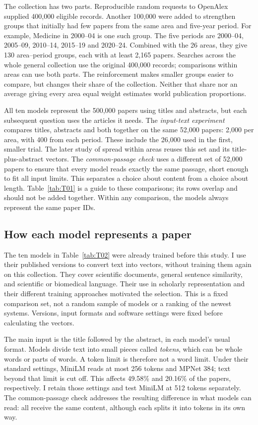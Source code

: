 \documentclass[12pt]{article}
\begin{document}
The collection has two parts. Reproducible random requests to OpenAlex supplied 400,000 eligible records. Another 100,000 were added to strengthen groups that initially had few papers from the same area and five-year period. For example, Medicine in 2000--04 is one such group. The five periods are 2000--04, 2005--09, 2010--14, 2015--19 and 2020--24. Combined with the 26 areas, they give 130 area--period groups, each with at least 2,165 papers. Searches across the whole general collection use the original 400,000 records; comparisons within areas can use both parts. The reinforcement makes smaller groups easier to compare, but changes their share of the collection. Neither that share nor an average giving every area equal weight estimates world publication proportions.

All ten models represent the 500,000 papers using titles and abstracts, but each subsequent question uses the articles it needs. The \emph{input-text experiment} compares titles, abstracts and both together on the same 52,000 papers: 2,000 per area, with 400 from each period. These include the 26,000 used in the first, smaller trial. The later study of spread within areas reuses this set and its title-plus-abstract vectors. The \emph{common-passage check} uses a different set of 52,000 papers to ensure that every model reads exactly the same passage, short enough to fit all input limits. This separates a choice about content from a choice about length. Table~\ref{tab:T01} is a guide to these comparisons; its rows overlap and should not be added together. Within any comparison, the models always represent the same paper IDs.


\subsection{How each model represents a paper}
The ten models in Table~\ref{tab:T02} were already trained before this study. I use their published versions to convert text into vectors, without training them again on this collection. They cover scientific documents, general sentence similarity, and scientific or biomedical language. Their use in scholarly representation and their different training approaches motivated the selection. This is a fixed comparison set, not a random sample of models or a ranking of the newest systems. Versions, input formats and software settings were fixed before calculating the vectors.

The main input is the title followed by the abstract, in each model's usual format. Models divide text into small pieces called \emph{tokens}, which can be whole words or parts of words. A token limit is therefore not a word limit. Under their standard settings, MiniLM reads at most 256 tokens and MPNet 384; text beyond that limit is cut off. This affects 49.58\% and 20.16\% of the papers, respectively. I retain those settings and test MiniLM at 512 tokens separately. The common-passage check addresses the resulting difference in what models can read: all receive the same content, although each splits it into tokens in its own way.
\end{document}
